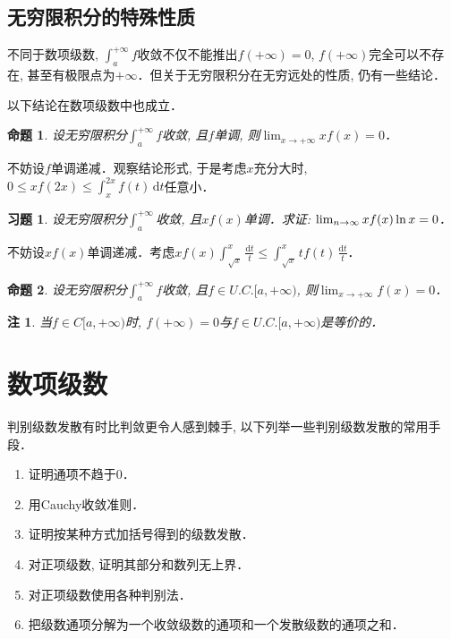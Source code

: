\documentclass[11pt,a4paper]{ctexart}
\makeatletter
\theoremstyle{thmseries} %
\newtheorem{prop}{命题}[section]
\theoremstyle{exerseries}
\newtheorem{exer}{习题}[section]
\newtheorem*{rem}{注}
\renewenvironment{proof}[1][\proofname]{\par
  \pushQED{\qed}%
  \normalfont \topsep6\p@\@plus6\p@\relax
  \trivlist
  \item[\hskip\labelsep
        \itshape
    #1\@addpunct{}]\ignorespaces
}{%
  \popQED\endtrivlist\@endpefalse
}
\newenvironment{pf}{\begin{proof}[\bfseries\upshape 证\quad]}{\end{proof}}
\renewcommand{\d}{\mathrm{d}}
\def \nti {\mathnormal{n}\to\infty}
\makeatother
\begin{document}
\subsection{无穷限积分的特殊性质}
不同于数项级数, $\int_{a}^{+\infty}f$收敛不仅不能推出$f(+\infty)=0$, $f(+\infty)$完全可以不存在, 甚至有极限点为$+\infty$．但关于无穷限积分在无穷远处的性质, 仍有一些结论．

以下结论在数项级数中也成立．
\begin{prop}
	设无穷限积分$\int_{a}^{+\infty}f$收敛, 且$f$单调, 则$\lim_{x\to+\infty}xf(x)=0$．
\end{prop}
\begin{pf}
	不妨设$f$单调递减．观察结论形式, 于是考虑$x$充分大时, $0\leq xf(2x)\leq\int_{x}^{2x}f(t)\,\d t$任意小．
\end{pf}

\begin{exer}
	设无穷限积分$\int_{a}^{+\infty}$收敛, 且$xf(x)$单调．求证: $\lim_{\nti}xf(x)\ln x=0$．
\end{exer}
\begin{pf}
	不妨设$xf(x)$单调递减．考虑$xf(x)\int_{\sqrt{x}}^{x}\frac{\d t}{t}\leq\int_{\sqrt{x}}^{x}tf(t)\,\frac{\d t}{t}$．
\end{pf}

\begin{prop}
	设无穷限积分$\int_{a}^{+\infty}f$收敛, 且$f\in U.C.[a,+\infty)$, 则$\lim_{x\to+\infty}f(x)=0$．
\end{prop}
\begin{rem}
	当$f\in C[a,+\infty)$时, $f(+\infty)=0$与$f\in U.C.[a,+\infty)$是等价的．
\end{rem}


\section{数项级数}
判别级数发散有时比判敛更令人感到棘手, 以下列举一些判别级数发散的常用手段．
\begin{enumerate}
	\item 证明通项不趋于$0$．
	\item 用Cauchy收敛准则．
	\item 证明按某种方式加括号得到的级数发散．
	\item 对正项级数, 证明其部分和数列无上界．
	\item 对正项级数使用各种判别法．
	\item 把级数通项分解为一个收敛级数的通项和一个发散级数的通项之和．
\end{enumerate}
\end{document}
